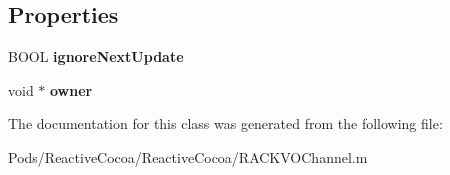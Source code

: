 \subsection*{Properties}
\begin{DoxyCompactItemize}
\item 
\mbox{\label{interface_r_a_c_k_v_o_channel_data_a7ee5fd08437e49e61ed9cd80f46da5e3}} 
B\+O\+OL {\bfseries ignore\+Next\+Update}
\item 
\mbox{\label{interface_r_a_c_k_v_o_channel_data_aa38cfa4a218487a33d34a89bbf7682e0}} 
void $\ast$ {\bfseries owner}
\end{DoxyCompactItemize}


The documentation for this class was generated from the following file\+:\begin{DoxyCompactItemize}
\item 
Pods/\+Reactive\+Cocoa/\+Reactive\+Cocoa/R\+A\+C\+K\+V\+O\+Channel.\+m\end{DoxyCompactItemize}
